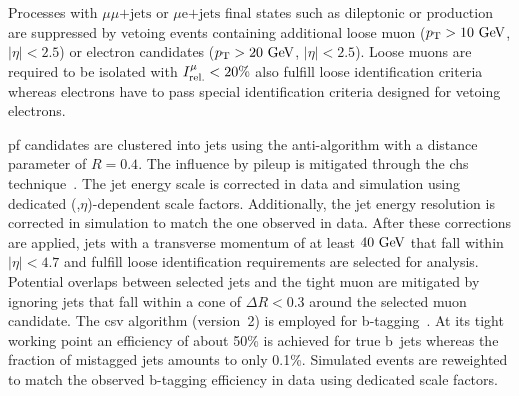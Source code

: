 

Processes with $\mu\mu\mathrm{\mbox{+}jets}$ or $\mu\mathrm{e}\mathrm{\mbox{+}jets}$ final states such as dileptonic \ttbar or \zjets production are suppressed by vetoing events containing additional loose muon ($p_\textrm{T}>10~\textrm{GeV}$, $|\eta|<2.5$) or electron candidates ($p_\textrm{T}>20~\textrm{GeV}$, $|\eta|<2.5$). Loose muons are required to be isolated with $I_\textrm{rel.}^{\mu}<20\%$ also fulfill loose identification criteria whereas electrons have to pass special identification criteria designed for vetoing electrons.

\Gls{pf} candidates are clustered into jets using the anti-\kt algorithm with a distance parameter of $R=0.4$. The influence by pileup is mitigated through the \gls{chs} technique~\cite{CMS-PAS-JME-14-001}. The jet energy scale is corrected in data and simulation using dedicated (\pt,$\eta$)-dependent scale factors. Additionally, the jet energy resolution is corrected in simulation to match the one observed in data. After these corrections are applied, jets with a transverse momentum of at least $40~\textrm{GeV}$ that fall within $|\eta|<4.7$ and fulfill loose identification requirements are selected for analysis. Potential overlaps between selected jets and the tight muon are mitigated by ignoring jets that fall within a cone of $\Delta R<0.3$ around the selected muon candidate. The \acrfull{csv} algorithm (version~2) is employed for b-tagging~\cite{CMS-PAS-BTV-15-001}. At its tight working point an efficiency of about 50\% is achieved for true b~jets whereas the fraction of mistagged jets amounts to only 0.1\%. Simulated events are reweighted to match the observed b-tagging efficiency in data using dedicated scale factors.

